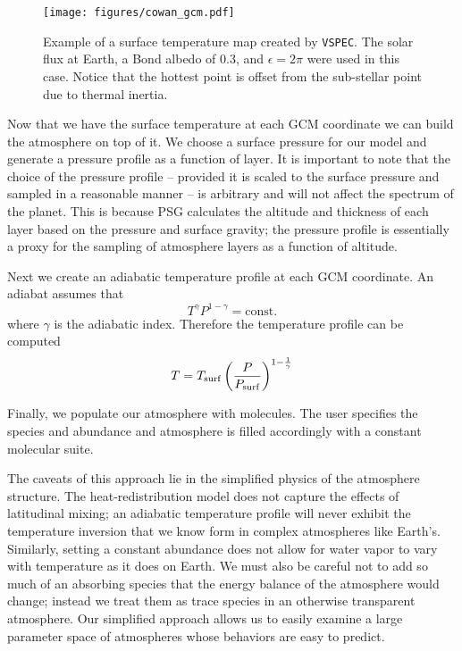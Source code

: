 \documentclass[twocolumn]{aastex631}
\newcommand{\vspec}[1]{\texttt{VSPEC}#1}
\begin{document}
\begin{figure}
    \centering
    \texttt{[image: figures/cowan\_gcm.pdf]}
    \caption{
        Example of a surface temperature map created by \vspec{}. The solar flux at Earth,
        a Bond albedo of 0.3, and $\epsilon = 2\pi$ were used in this case.
        Notice that the hottest point is offset from the sub-stellar point due to thermal inertia.
    }
    \label{fig:thermal_inertia}
\end{figure}

Now that we have the surface temperature at each GCM coordinate we can build the atmosphere on top of it.
We choose a surface pressure for our model and generate a pressure profile as a function of layer. It is
important to note that the choice of the pressure profile -- provided it is scaled to the surface pressure and sampled in a reasonable manner -- is
arbitrary and will not affect the spectrum of the planet. This is because PSG calculates the altitude and thickness of each layer based on the
pressure and surface gravity; the pressure profile is essentially a proxy for the sampling of atmosphere layers as a function of altitude.

Next we create an adiabatic temperature profile at each GCM coordinate. An adiabat assumes that
\begin{equation}
    T^\gamma P^{1 - \gamma} = \text{const.}
\end{equation}
where $\gamma$ is the adiabatic index. Therefore the temperature profile can be computed
\begin{equation}
    T = T_{\rm surf} \left(\frac{P}{P_{\rm surf}} \right)^{1 - \frac{1}{\gamma} }
\end{equation}

Finally, we populate our atmosphere with molecules. The user specifies the species and abundance and atmosphere is filled accordingly with a constant molecular suite.

The caveats of this approach lie in the simplified physics of the atmosphere structure. The heat-redistribution model does not
capture the effects of latitudinal mixing; an adiabatic temperature profile will never exhibit the temperature inversion
that we know form in complex atmospheres like Earth's. Similarly, setting a constant abundance does not allow for water vapor to
vary with temperature as it does on Earth. We must also be careful not to add so much of an absorbing species that the energy balance of
the atmosphere would change; instead we treat them as trace species in an otherwise transparent atmosphere. Our simplified approach
allows us to easily examine a large parameter space of atmospheres whose behaviors are easy to predict.
\end{document}
